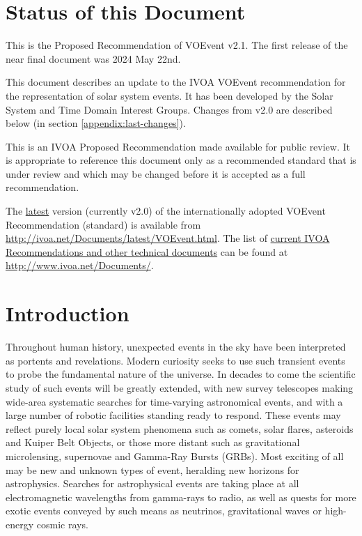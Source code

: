\documentclass[11pt,a4paper]{ivoa}
\begin{document}
\section*{Status of this Document}
This is the Proposed Recommendation of VOEvent v2.1. The first release of the
near final document was 2024 May 22nd.

This document describes an update to the IVOA VOEvent recommendation for the
representation of solar system events. It has been developed by the Solar System
and Time Domain Interest Groups. Changes from v2.0 are described below (in
section \ref{appendix:last-changes}).

This is an IVOA Proposed Recommendation made available for public review. It is
appropriate to reference this document only as a recommended standard that is
under review and which may be changed before it is accepted as a full
recommendation.

The \href{http://ivoa.net/Documents/latest/VOEvent.html}{latest} version
(currently v2.0) of the internationally adopted VOEvent Recommendation
(standard) is available from \url{http://ivoa.net/Documents/latest/VOEvent.html}.
The list of \href{http://www.ivoa.net/Documents/}{current IVOA Recommendations
and other technical documents} can be found at \url{http://www.ivoa.net/Documents/}.

\section{Introduction}

Throughout human history, unexpected events in the sky have been interpreted as
portents and revelations. Modern curiosity seeks to use such transient events to
probe the fundamental nature of the universe. In decades to come the scientific
study of such events will be greatly extended, with new survey telescopes making
wide-area systematic searches for time-varying astronomical events, and with a
large number of robotic facilities standing ready to respond. These events may
reflect purely local solar system phenomena such as comets, solar flares,
asteroids and Kuiper Belt Objects, or those more distant such as gravitational
microlensing, supernovae and Gamma-Ray Bursts (GRBs). Most exciting of all may
be new and unknown types of event, heralding new horizons for astrophysics.
Searches for astrophysical events are taking place at all electromagnetic
wavelengths from gamma-rays to radio, as well as quests for more exotic events
conveyed by such means as neutrinos, gravitational waves or high-energy cosmic
rays.
\end{document}
